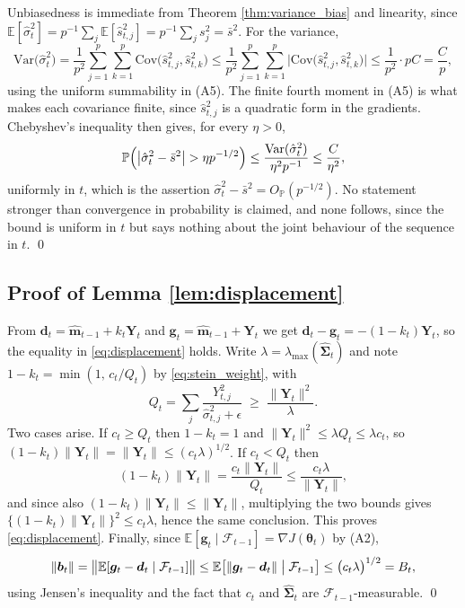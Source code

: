 \documentclass[pdflatex,sn-mathphys-num]{sn-jnl}%
\theoremstyle{thmstyleone}%
\theoremstyle{thmstyletwo}%
\theoremstyle{thmstylethree}%
\newcommand{\Var}{\mathrm{Var}}
\newcommand{\Cov}{\mathrm{Cov}}
\newcommand{\E}{\mathbb{E}}
\begin{document}
\begin{appendices}
Unbiasedness is immediate from Theorem \ref{thm:variance_bias} and linearity, since $\E[\hat\sigma^2_t]=p^{-1}\sum_j\E[\hat s^2_{t,j}]=p^{-1}\sum_js^2_j=\bar s^2$. For the variance,
\begin{equation}
\Var\bigl(\hat\sigma^2_t\bigr)
=
\frac{1}{p^{2}}\sum_{j=1}^{p}\sum_{k=1}^{p}\Cov\bigl(\hat s^2_{t,j},\hat s^2_{t,k}\bigr)
\le
\frac{1}{p^{2}}\sum_{j=1}^{p}\sum_{k=1}^{p}\bigl|\Cov\bigl(\hat s^2_{t,j},\hat s^2_{t,k}\bigr)\bigr|
\le
\frac{1}{p^{2}}\cdot pC
=\frac{C}{p},
\end{equation}
using the uniform summability in (A5). The finite fourth moment in (A5) is what makes each covariance finite, since $\hat s^2_{t,j}$ is a quadratic form in the gradients. Chebyshev's inequality then gives, for every $\eta>0$,
\begin{equation}
\mathbb P\Bigl(\bigl|\hat\sigma^2_t-\bar s^2\bigr|>\eta p^{-1/2}\Bigr)
\le
\frac{\Var(\hat\sigma^2_t)}{\eta^{2}p^{-1}}
\le
\frac{C}{\eta^{2}},
\end{equation}
uniformly in $t$, which is the assertion $\hat\sigma^2_t-\bar s^2=O_{\mathbb P}(p^{-1/2})$. No statement stronger than convergence in probability is claimed, and none follows, since the bound is uniform in $t$ but says nothing about the joint behaviour of the sequence in $t$. \qed

\subsection*{Proof of Lemma \ref{lem:displacement}}

From $\bm d_t=\hat{\bm m}_{t-1}+k_t\bm Y_t$ and $\bm g_t=\hat{\bm m}_{t-1}+\bm Y_t$ we get $\bm d_t-\bm g_t=-(1-k_t)\bm Y_t$, so the equality in \eqref{eq:displacement} holds. Write $\lambda=\lambda_{\max}(\widehat{\bm\Sigma}_t)$ and note $1-k_t=\min(1,\,c_t/Q_t)$ by \eqref{eq:stein_weight}, with
\begin{equation}
Q_t=\sum_{j}\frac{Y^2_{t,j}}{\hat\sigma^2_{t,j}+\epsilon}\;\ge\;\frac{\|\bm Y_t\|^2}{\lambda}.
\end{equation}
Two cases arise. If $c_t\ge Q_t$ then $1-k_t=1$ and $\|\bm Y_t\|^2\le\lambda Q_t\le\lambda c_t$, so $(1-k_t)\|\bm Y_t\|=\|\bm Y_t\|\le(c_t\lambda)^{1/2}$. If $c_t<Q_t$ then
\begin{equation}
(1-k_t)\|\bm Y_t\|=\frac{c_t\|\bm Y_t\|}{Q_t}\le\frac{c_t\lambda}{\|\bm Y_t\|},
\end{equation}
and since also $(1-k_t)\|\bm Y_t\|\le\|\bm Y_t\|$, multiplying the two bounds gives $\{(1-k_t)\|\bm Y_t\|\}^2\le c_t\lambda$, hence the same conclusion. This proves \eqref{eq:displacement}. Finally, since $\E[\bm g_t\mid\mathcal F_{t-1}]=\nabla J(\bm\theta_t)$ by (A2),
\begin{equation}
\|\bm b_t\|=\bigl\|\E[\bm g_t-\bm d_t\mid\mathcal F_{t-1}]\bigr\|
\le\E\bigl[\|\bm g_t-\bm d_t\|\bigm|\mathcal F_{t-1}\bigr]
\le\bigl(c_t\lambda\bigr)^{1/2}=B_t,
\end{equation}
using Jensen's inequality and the fact that $c_t$ and $\widehat{\bm\Sigma}_t$ are $\mathcal F_{t-1}$-measurable. \qed


\end{appendices}
\end{document}
